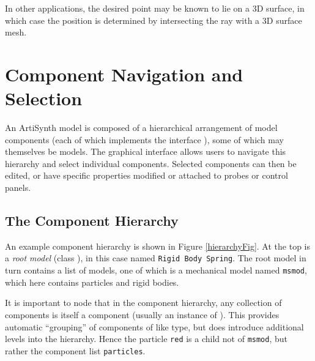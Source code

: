 \documentclass{article}
\begin{document}
In other applications, the desired point may be known to lie on a 3D
surface, in which case the position is determined by intersecting the
ray with a 3D surface mesh.

\section{Component Navigation and Selection}

An ArtiSynth model is composed of a hierarchical arrangement of
model components (each of which implements the interface 
), 
some of which may themselves
be models. The graphical interface allows users to navigate this
hierarchy and select individual components. Selected components
can then be edited, or have specific properties modified or attached
to probes or control panels.

\subsection{The Component Hierarchy}

An example component hierarchy is shown in Figure
\ref{hierarchyFig}. At the top is a {\it root model} (class
), 
in this case named {\tt Rigid Body Spring}.  The
root model in turn contains a list of models, one of which is a
mechanical model named {\tt msmod}, which here contains particles and
rigid bodies.

It is important to node that in the component hierarchy, any collection
of components is itself a component (usually an instance of
). 
This provides automatic ``grouping'' of
components of like type, but does introduce additional levels into the
hierarchy. Hence the particle {\tt red} is a child not of {\tt msmod},
but rather the component list {\tt particles}.
\end{document}
